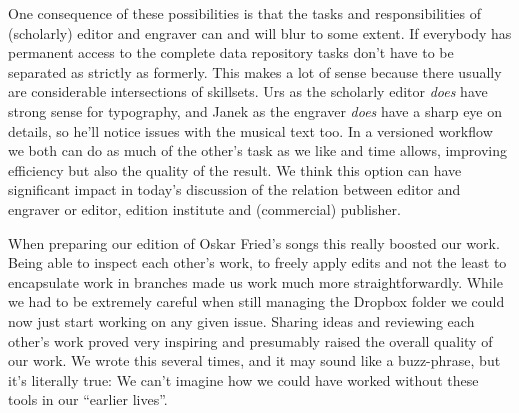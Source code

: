\documentclass[11pt,a4paper]{article}
\begin{document}
One consequence of these possibilities is that the tasks and responsibilities of
(scholarly) editor and engraver can and will blur to some extent. If everybody has
permanent access to the complete data repository tasks don't have to be separated as
strictly as formerly. This makes a lot of sense because there usually are considerable
intersections of skillsets. Urs as the scholarly editor \emph{does} have strong sense
for typography, and Janek as the engraver \emph{does} have a sharp eye on details, so
he'll notice issues with the musical text too. In a versioned workflow we both can do
as much of the other's task as we like and time allows, improving efficiency but also
the quality of the result. We think this option can have significant impact in today's
discussion of the relation between editor and engraver or editor, edition institute and
(commercial) publisher.

When preparing our edition of Oskar Fried's songs this really boosted our work. Being
able to inspect each other's work, to freely apply edits and not the least to encapsulate
work in branches made us work much more straightforwardly. While we had to be
extremely careful when still managing the Dropbox folder we could now just start working
on any given issue. Sharing ideas and reviewing each other's work proved very inspiring
and presumably raised the overall quality of our work. We wrote this several times, and
it may sound like a buzz-phrase, but it's literally true: We can't imagine how we could
have worked without these tools in our “earlier lives”.
\end{document}
